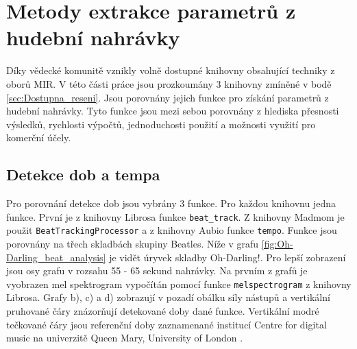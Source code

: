 
\section{Metody extrakce parametrů z hudební nahrávky} \label{sec:Exktrakce_vlastnosti_metody}
Díky vědecké komunitě vznikly volně dostupné knihovny obsahující techniky z oborů \acs{MIR}. V této části práce jsou prozkoumány 3 knihovny zmíněné v bodě \ref{sec:Dostupna_reseni}. Jsou porovnány jejich funkce pro získání parametrů z hudební nahrávky. Tyto funkce jsou mezi sebou porovnány z hlediska přesnosti výsledků, rychlosti výpočtů, jednoduchosti použití a možnosti využití pro komerční účely. 

\subsection{Detekce dob a tempa}
Pro porovnání detekce dob jsou vybrány 3 funkce. Pro každou knihovnu jedna funkce. První je z knihovny Librosa funkce \texttt{beat\_track}. Z knihovny Madmom je použit \texttt{BeatTrackingProcessor} a z knihovny Aubio funkce \texttt{tempo}. Funkce jsou porovnány na třech skladbách skupiny Beatles. Níže v grafu \ref{fig:Oh-Darling_beat_analysis} je vidět úryvek skladby Oh-Darling!. Pro lepší zobrazení jsou osy grafu v rozsahu 55 - 65 sekund nahrávky. Na prvním z grafů je vyobrazen mel spektrogram vypočítán pomocí funkce \texttt{melspectrogram} z knihovny Librosa. Grafy b), c) a d) zobrazují v pozadí obálku síly nástupů a vertikální pruhované čáry znázorňují detekované doby dané funkce. Vertikální modré tečkované čáry jsou referenční doby zaznamenané institucí Centre for digital music na univerzitě Queen Mary, University of London \cite{Isophonic}. 


